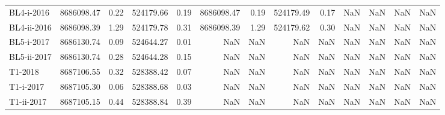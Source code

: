 \begin{tabular}{lrrrrrrrrrrrr}
  BL4-i-2016 &                8686098.47 &                            0.22 &                524179.66 &                           0.19 &                8686098.47 &                            0.19 &                524179.49 &                           0.17 &                       NaN &                             NaN &                      NaN &                            NaN \\
 BL4-ii-2016 &                8686098.39 &                            1.29 &                524179.78 &                           0.31 &                8686098.39 &                            1.29 &                524179.62 &                           0.30 &                       NaN &                             NaN &                      NaN &                            NaN \\
  BL5-i-2017 &                8686130.74 &                            0.09 &                524644.27 &                           0.01 &                       NaN &                             NaN &                      NaN &                            NaN &                       NaN &                             NaN &                      NaN &                            NaN \\
 BL5-ii-2017 &                8686130.74 &                            0.28 &                524644.28 &                           0.15 &                       NaN &                             NaN &                      NaN &                            NaN &                       NaN &                             NaN &                      NaN &                            NaN \\
     T1-2018 &                8687106.55 &                            0.32 &                528388.42 &                           0.07 &                       NaN &                             NaN &                      NaN &                            NaN &                       NaN &                             NaN &                      NaN &                            NaN \\
   T1-i-2017 &                8687105.30 &                            0.06 &                528388.68 &                           0.03 &                       NaN &                             NaN &                      NaN &                            NaN &                       NaN &                             NaN &                      NaN &                            NaN \\
  T1-ii-2017 &                8687105.15 &                            0.44 &                528388.84 &                           0.39 &                       NaN &                             NaN &                      NaN &                            NaN &                       NaN &                             NaN &                      NaN &                            NaN \\

\end{tabular}
